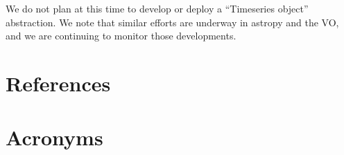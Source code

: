 \documentclass[DM,authoryear,toc]{lsstdoc}
\begin{document}
We do not plan at this time to develop or deploy a ``Timeseries object'' abstraction.
We note that similar efforts are underway in astropy and the VO, and we are continuing to monitor those developments.

\appendix
\section{References} \label{sec:bib}


\section{Acronyms} \label{sec:acronyms}

\end{document}
